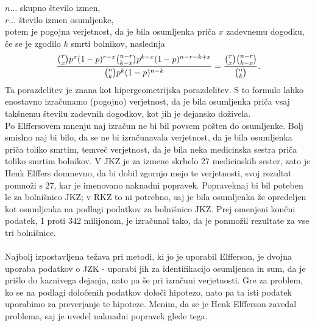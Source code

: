 \documentclass[fin1, tisk]{fmfdelo}
\theoremstyle{definition}
\theoremstyle{trditev}
\theoremstyle{izrek}
\begin{document}
$n \dots$ skupno število izmen,\\
$r \dots$ število izmen osumljenke, \\
potem je pogojna verjetnost, da je bila osumljenka priča $x$ zadevnemu dogodku, če se je zgodilo $k$ smrti bolnikov, naslednja 
\begin{equation}\label{eq:l_pogojna}
    \frac{\binom{r}{x}p^x(1-p)^{r-x}\binom{n-r}{k-x}p^{k-x}(1-p)^{n-r-k+x}}{\binom{n}{k}p^k(1-p)^{n-k}} = \frac{\binom{r}{x}\binom{n-r}{k-x}}{\binom{n}{k}}.\vspace{2mm}
\end{equation}
Ta porazdelitev je znana kot hipergeometrijska porazdelitev. S to formulo lahko enostavno izračunamo (pogojno) verjetnost, da je bila osumljenka 
priča vsaj takšnemu številu zadevnih dogodkov, kot jih je dejansko doživela.\\
Po Elffersovem mnenju naj izračun ne bi bil povsem pošten do osumljenke. Bolj smislno naj bi bilo, da se ne bi izračunavala verjetnost, da je 
bila osumljenka priča toliko smrtim, temveč verjetnost, da je bila neka medicinska sestra priča toliko smrtim bolnikov. V JKZ je za izmene skrbelo 
27 medicinskih sester, zato je Henk Elffers domnevno, da bi dobil zgornjo mejo te verjetnosti, svoj rezultat pomnoži s 27, kar je imenovano 
naknadni popravek. Popraveknaj bi bil poteben le za bolnišnico JKZ; v RKZ to ni potrebno, saj je bila osumljenka že opredeljen kot osumljenka 
na podlagi podatkov za bolnišnico JKZ. Prej omenjeni končni podatek, 1 proti 342 milijonom, je izračunal tako, da je pomnožil rezultate za vse 
tri bolnišnice.\\\\
Najbolj izpostavljena težava pri metodi, ki jo je uporabil Elfferson, je dvojna uporaba podatkov o JZK - uporabi jih za identifikacijo osumljenca 
in sum, da je prišlo do kaznivega dejanja, nato pa še pri izračuni verjetnosti. Gre za problem, ko se na podlagi določenih podatkov določi hipotezo, nato 
pa ta isti podatek uporabimo za preverjanje te hipoteze. Menim, da se je Henk Elfferson zavedal problema, saj je uvedel naknadni popravek glede tega. 

\end{document}
